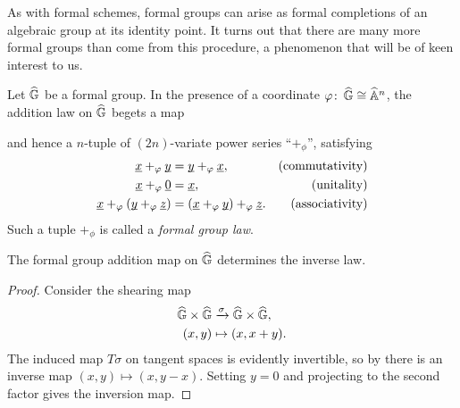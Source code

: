 \begin{remark}
As with formal schemes, formal groups can arise as formal completions of an algebraic group at its identity point.  It turns out that there are many more formal groups than come from this procedure, a phenomenon that will be of keen interest to us.
\end{remark}

\begin{definition}\label{FGLDefinition}
Let $\G$ be a formal group.  In the presence of a coordinate $\phi \co \G \cong \A^n$, the addition law on $\G$ begets a map
\begin{center}
\end{center}
and hence a $n$-tuple of $(2n)$-variate power series ``$+_\phi$'', satisfying
\begin{align*}
\underline{\smash x} +_\phi \underline{\smash y} & = \underline{\smash y} +_\phi \underline{\smash x}, & \text{(commutativity)} \\
\underline{\smash x} +_\phi \underline{\smash 0} & = \underline{\smash x}, & \text{(unitality)} \\
\underline{\smash x} +_\phi (\underline{\smash y} +_\phi \underline{\smash z}) & = (\underline{\smash x} +_\phi \underline{\smash y}) +_\phi \underline{\smash z}. & \text{(associativity)}
\end{align*}
Such a tuple $+_\phi$ is called a \textit{formal group law}.
\end{definition}

\begin{corollary}
The formal group addition map on $\G$ determines the inverse law.
\end{corollary}
\begin{proof}
Consider the shearing map
\begin{align*}
\G \times \G & \xrightarrow{\sigma} \G \times \G, \\
(x, y) & \mapsto (x, x + y).
\end{align*}
The induced map $T\sigma$ on tangent spaces is evidently invertible, so by  there is an inverse map $(x, y) \mapsto (x, y - x)$.  Setting $y = 0$ and projecting to the second factor gives the inversion map.
\end{proof}


